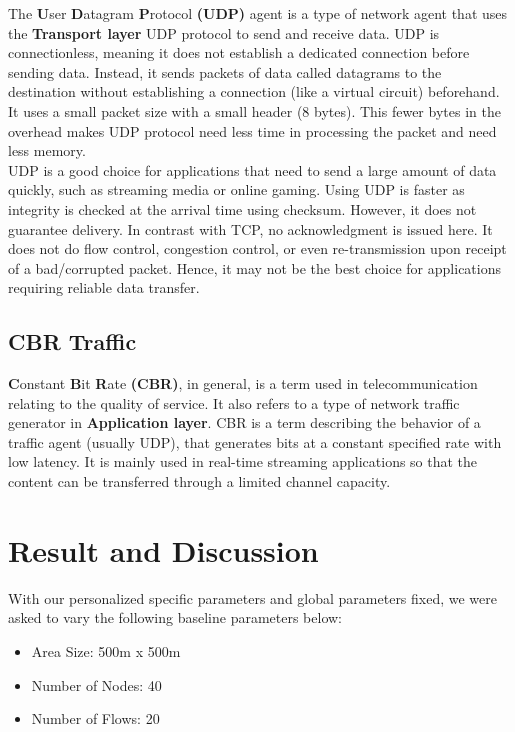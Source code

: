 \documentclass[24pt, a4paper]{article} %
\begin{document}
The \textbf{U}ser \textbf{D}atagram \textbf{P}rotocol \textbf{(UDP)} agent is a type of network agent that uses the \textbf{Transport layer} UDP protocol to send and receive data. UDP is connectionless, meaning it does not establish a dedicated connection before sending data. Instead, it sends packets of data called datagrams to the destination without establishing a connection (like a virtual circuit) beforehand. It uses a small packet size with a small header (8 bytes). This fewer bytes in the overhead makes UDP protocol need less time in processing the packet and need less memory.\\

UDP is a good choice for applications that need to send a large amount of data quickly, such as streaming media or online gaming. Using UDP is faster as integrity is checked at the arrival time using checksum. However, it does not guarantee delivery. In contrast with TCP, no acknowledgment is issued here. It does not do flow control, congestion control, or even re-transmission upon receipt of a bad/corrupted packet. Hence, it may not be the best choice for applications requiring reliable data transfer.

\subsection{CBR Traffic}

\textbf{C}onstant \textbf{B}it \textbf{R}ate \textbf{(CBR)}, in general, is a term used in telecommunication relating to the quality of service. It also refers to a type of network traffic generator in \textbf{Application layer}. CBR is a term describing the behavior of a traffic agent (usually UDP), that generates bits at a constant specified rate with low latency. It is mainly used in real-time streaming applications so that the content can be transferred through a limited channel capacity. 

\section{Result and Discussion}

With our personalized specific parameters and global parameters fixed, we were asked to vary the following baseline parameters below:

\begin{itemize}
    \item Area Size: 500m x 500m
    \item Number of Nodes: 40
    \item Number of Flows: 20
\end{itemize}
\end{document}
